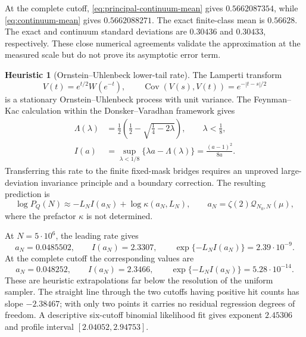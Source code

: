 \documentclass[11pt,reqno]{amsart}
\numberwithin{equation}{section}
\theoremstyle{plain}
\theoremstyle{definition}
\newtheorem{heuristic}[theorem]{Heuristic}
\theoremstyle{remark}
\newcommand{\Cov}{\operatorname{Cov}}
\newcommand{\QF}{\mathcal Q}
\begin{document}
At the complete cutoff, \eqref{eq:principal-continuum-mean} gives
\(0.5662087354\), while \eqref{eq:continuum-mean} gives
\(0.5662088271\).  The exact finite-class mean is \(0.56628\).  The exact and
continuum standard deviations are \(0.30436\) and \(0.30433\), respectively.
These close numerical agreements validate the approximation at the measured
scale but do not prove its asymptotic error term.

\begin{heuristic}[Ornstein--Uhlenbeck lower-tail rate]
\label{heur:ou-rate}
The Lamperti transform
\begin{equation}
V(t)=e^{t/2}W(e^{-t}),\qquad
\Cov(V(s),V(t))=e^{-|t-s|/2}
\label{eq:lamperti-transform}
\end{equation}
is a stationary Ornstein--Uhlenbeck process with unit variance.  The
Feynman--Kac calculation within the Donsker--Varadhan framework
\cite{DonskerVaradhan1975} gives
\begin{align}
\Lambda(\lambda)
&=\frac12\left(\frac12-\sqrt{\frac14-2\lambda}\right),
\qquad\lambda<\frac18,
\label{eq:ou-cumulant}\\
I(a)
&=\sup_{\lambda<1/8}\{\lambda a-\Lambda(\lambda)\}
=\frac{(a-1)^2}{8a}.
\label{eq:ou-rate-function}
\end{align}
Transferring this rate to the finite fixed-mask bridges requires an unproved
large-deviation invariance principle and a boundary correction.  The
resulting prediction is
\begin{equation}
\log P_Q(N)\approx-L_NI(a_N)+\log\kappa(a_N,L_N),
\qquad a_N=\zeta(2)\QF_{N_0,N}(\mu),
\label{eq:ou-lower-tail-prediction}
\end{equation}
where the prefactor \(\kappa\) is not determined.
\end{heuristic}

At \(N=5\cdot10^6\), the leading rate gives
\begin{equation}
a_N=0.0485502,\qquad I(a_N)=2.3307,\qquad
\exp\{-L_NI(a_N)\}=2.39\cdot10^{-9}.
\label{eq:ou-five-million-prediction}
\end{equation}
At the complete cutoff the corresponding values are
\begin{equation}
a_N=0.048252,\qquad I(a_N)=2.3466,\qquad
\exp\{-L_NI(a_N)\}=5.28\cdot10^{-14}.
\label{eq:ou-complete-prediction}
\end{equation}
These are heuristic extrapolations far below the resolution of the uniform
sampler.  The straight line through the two cutoffs having positive hit
counts has slope \(-2.38467\); with only two points it carries no residual
regression degrees of freedom.  A descriptive six-cutoff binomial likelihood
fit gives exponent \(2.45306\) and profile interval
\([2.04052,2.94753]\).
\end{document}
